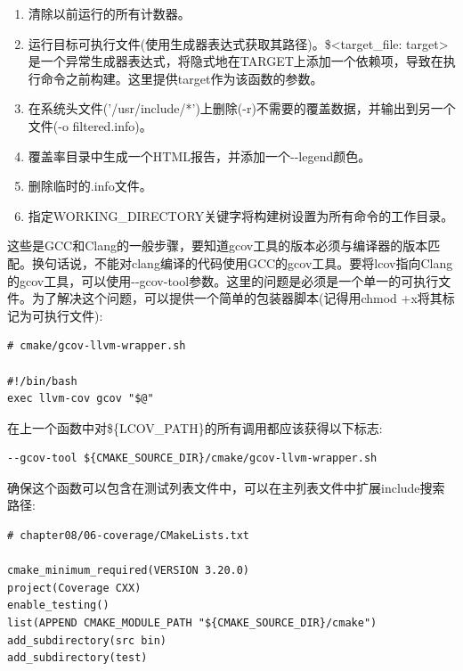 \begin{enumerate}
\item 
清除以前运行的所有计数器。

\item 
运行目标可执行文件(使用生成器表达式获取其路径)。\$<target\_file: target>是一个异常生成器表达式，将隐式地在TARGET上添加一个依赖项，导致在执行命令之前构建。这里提供target作为该函数的参数。

\item 
在系统头文件('/usr/include/*')上删除(-r)不需要的覆盖数据，并输出到另一个文件(-o filtered.info)。

\item 
覆盖率目录中生成一个HTML报告，并添加一个-{}-legend颜色。

\item 
删除临时的.info文件。

\item 
指定WORKING\_DIRECTORY关键字将构建树设置为所有命令的工作目录。
\end{enumerate}

这些是GCC和Clang的一般步骤，要知道gcov工具的版本必须与编译器的版本匹配。换句话说，不能对clang编译的代码使用GCC的gcov工具。要将lcov指向Clang的gcov工具，可以使用-{}-gcov-tool参数。这里的问题是必须是一个单一的可执行文件。为了解决这个问题，可以提供一个简单的包装器脚本(记得用chmod +x将其标记为可执行文件):

\begin{lstlisting}[style=stylePython]
# cmake/gcov-llvm-wrapper.sh

#!/bin/bash
exec llvm-cov gcov "$@"
\end{lstlisting}

在上一个函数中对\$\{LCOV\_PATH\}的所有调用都应该获得以下标志:

\begin{lstlisting}[style=stylePython]
--gcov-tool ${CMAKE_SOURCE_DIR}/cmake/gcov-llvm-wrapper.sh
\end{lstlisting}

确保这个函数可以包含在测试列表文件中，可以在主列表文件中扩展include搜索路径:

\begin{lstlisting}[style=styleCMake]
# chapter08/06-coverage/CMakeLists.txt

cmake_minimum_required(VERSION 3.20.0)
project(Coverage CXX)
enable_testing()
list(APPEND CMAKE_MODULE_PATH "${CMAKE_SOURCE_DIR}/cmake")
add_subdirectory(src bin)
add_subdirectory(test)
\end{lstlisting}

